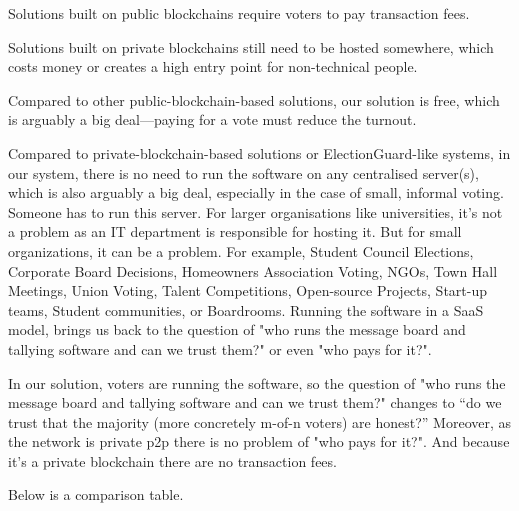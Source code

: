 \documentclass{article}
\begin{document}
Solutions built on public blockchains require voters to pay transaction fees.

Solutions built on private blockchains still need to be hosted somewhere, which costs money or creates a high entry point for non-technical people.

Compared to other public-blockchain-based solutions, our solution is free, which is arguably a big deal—paying for a vote must reduce the turnout.

Compared to private-blockchain-based solutions or ElectionGuard-like systems, in our system, there is no need to run the software on any centralised server(s), which is also arguably a big deal, especially in the case of small, informal voting. Someone has to run this server. For larger organisations like universities, it's not a problem as an IT department is responsible for hosting it. But for small organizations, it can be a problem. For example, Student Council Elections, Corporate Board Decisions, Homeowners Association Voting, NGOs, Town Hall Meetings, Union Voting, Talent Competitions, Open-source Projects, Start-up teams, Student communities, or Boardrooms. Running the software in a SaaS model, brings us back to the question of "who runs the message board and tallying software and can we trust them?" or even "who pays for it?".

In our solution, voters are running the software, so the question of "who runs the message board and tallying software and can we trust them?" changes to “do we trust that the majority (more concretely m-of-n voters) are honest?” Moreover, as the network is private p2p there is no problem of "who pays for it?". And because it's a private blockchain there are no transaction fees.

Below is a comparison table.

\newcommand{\fullmoon}{\tikz\filldraw[fill=black] (0,0) circle (0.5em);}
\newcommand{\newmoon}{\tikz\draw (0,0) circle (0.5em);}
\newcommand{\rightmoon}{\tikz\draw (0,0) circle (0.5em); \filldraw[fill=black] (0,0) arc (90:270:0.5em) -- cycle;}
\newcommand{\leftmoon}{\tikz\draw (0,0) circle (0.5em); \filldraw[fill=black] (0,0) arc (270:90:0.5em) -- cycle;}
\newcommand{\halfmoon}{\tikz\draw (0,0) circle (0.5em); \filldraw[fill=black] (0,-0.5em) rectangle (0,0.5em);}
\end{document}
